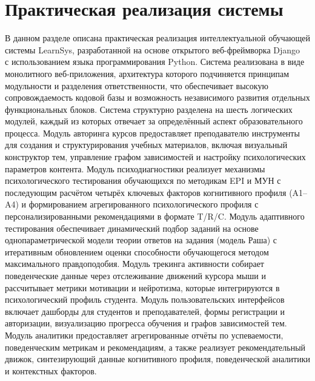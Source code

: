 \section{Практическая реализация системы}
\label{sec:practical_implementation}

В данном разделе описана практическая реализация интеллектуальной обучающей системы LearnSys, разработанной на основе открытого веб-фреймворка Django~\cite{django2026docs} с использованием языка программирования Python. Система реализована в виде монолитного веб-приложения, архитектура которого подчиняется принципам модульности и разделения ответственности, что обеспечивает высокую сопровождаемость кодовой базы и возможность независимого развития отдельных функциональных блоков.
Система структурно разделена на шесть логических модулей, каждый из которых отвечает за определённый аспект образовательного процесса. Модуль авторинга курсов предоставляет преподавателю инструменты для создания и структурирования учебных материалов, включая визуальный конструктор тем, управление графом зависимостей и настройку психологических параметров контента. Модуль психодиагностики реализует механизмы психологического тестирования обучающихся по методикам EPI и МУН с последующим расчётом четырёх ключевых факторов когнитивного профиля (A1--A4) и формированием агрегированного психологического профиля с персонализированными рекомендациями в формате T/R/C. Модуль адаптивного тестирования обеспечивает динамический подбор заданий на основе однопараметрической модели теории ответов на задания (модель Раша) с итеративным обновлением оценки способности обучающегося методом максимального правдоподобия. Модуль трекинга активности собирает поведенческие данные через отслеживание движений курсора мыши и рассчитывает метрики мотивации и нейротизма, которые интегрируются в психологический профиль студента. Модуль пользовательских интерфейсов включает дашборды для студентов и преподавателей, формы регистрации и авторизации, визуализацию прогресса обучения и графов зависимостей тем. Модуль аналитики предоставляет агрегированные отчёты по успеваемости, поведенческим метрикам и рекомендациям, а также реализует рекомендательный движок, синтезирующий данные когнитивного профиля, поведенческой аналитики и контекстных факторов.
